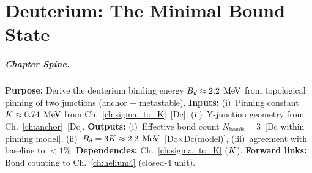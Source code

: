 
\chapter{Deuterium: The Minimal Bound State}
\label{ch:deuterium}


\begin{abstract}
Having established the metastable junction lifetime ($\taun \approx 880\second$)
in Part~II, we now test the EDC framework on the simplest multi-junction system:
the two-junction bound state (A=2). This chapter derives the binding energy
$B_d \approx 3\Kpin$ from topological pinning, where $\Kpin$ is the pinning
constant from Chapter~\ref{ch:sigma_to_K}. A local-optimality derivation
within the pairwise-additive pinning model establishes
$N_{\text{bonds}} = 3$ (Appendix~\ref{app:nbonds}), while geometric
arguments remain supporting motivations. The numerical result
$B_d \approx 2.22\MeV$ agrees with the baseline datum $B_d^{\text{exp}}
= 2.224\MeV$ to $< 1\%$.
Key status: the bond count is derived [Dc] within the local
pairwise-additive pinning model (Appendix~\ref{app:nbonds}); full [Der]
from $S_{\text{EDC}}$ remains open.
\end{abstract}

\paragraph{Chapter Spine.}
\textbf{Purpose:} Derive the deuterium binding energy $B_d \approx 2.2\;\,\mathrm{MeV}$
from topological pinning of two junctions (anchor + metastable).
\textbf{Inputs:} (i)~Pinning constant $K \approx 0.74\;\,\mathrm{MeV}$ from Ch.~\ref{ch:sigma_to_K}~[Dc],
(ii)~Y-junction geometry from Ch.~\ref{ch:anchor}~[Dc].
\textbf{Outputs:} (i)~Effective bond count $N_{\text{bonds}} = 3$~[Dc within pinning model],
(ii)~$B_d = 3K \approx 2.2\;\,\mathrm{MeV}$~[Dc$\times$Dc(model)],
(iii)~agreement with baseline to $< 1\%$.
\textbf{Dependencies:} Ch.~\ref{ch:sigma_to_K} ($\Kpin$).
\textbf{Forward links:} Bond counting to Ch.~\ref{ch:helium4} (closed-4 unit).


